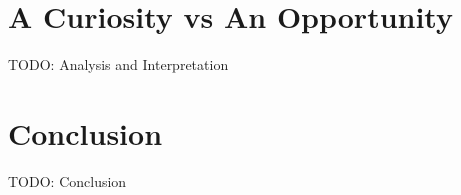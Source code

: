 
\newpage

\section{A Curiosity vs An Opportunity}
TODO: Analysis and Interpretation

\newpage

\section{Conclusion}
TODO: Conclusion
